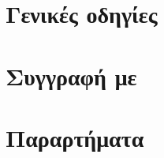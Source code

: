 \documentclass{kalliposstd}
\begin{document}
\mainmatter %
\part{Γενικές οδηγίες}





\part{Συγγραφή με \XeLaTeX}




\part{Παραρτήματα}
\appendix





\end{document}
